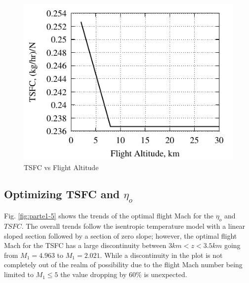 \documentclass[conf]{new-aiaa} %
\begin{document}
\begin{figure}[H] %
    \centering
    \includegraphics[]{media/performance_parameter_files/part_d_TSFC.pdf}
    \caption{\label{fig:partdtsfc}TSFC vs Flight Altitude}
\end{figure}

\subsection{Optimizing TSFC and \texorpdfstring{$\eta_o$}{Overall Efficiency}} %
Fig. \ref{fig:parte1-5} shows the trends of the optimal flight Mach for the $\eta_o$ and $TSFC$. The overall trends follow the isentropic temperature model with a linear sloped section followed by a section of zero slope; however, the optimal flight Mach for the TSFC has a large discontinuity between $3km<z<3.5km$ going from $M_1=4.963$ to $M_1=2.021$. While a discontinuity in the plot is not completely out of the realm of possibility due to the flight Mach number being limited to $M_1\leq5$ the value dropping by 60\% is unexpected.
\end{document}
